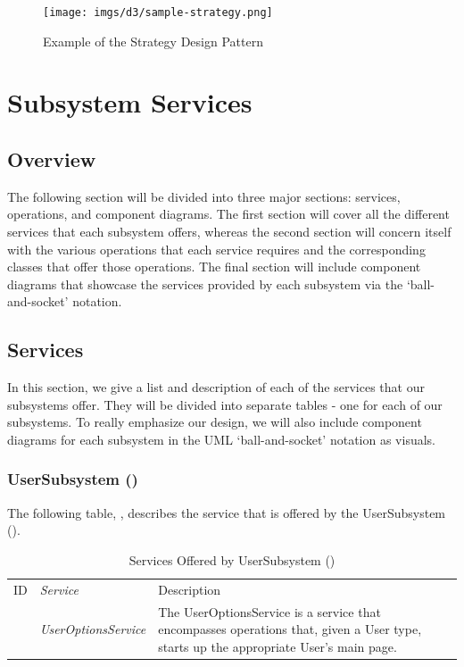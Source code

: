 \documentclass[12pt,letterpaper]{article}
\begin{document}
\begin{figure}[H]
	\centering{}
	\texttt{[image: imgs/d3/sample-strategy.png]}
	\caption{Example of the Strategy Design Pattern}
\end{figure}

\section{Subsystem Services}
\subsection{Overview}

The following section will be divided into three major sections: services, operations, and component diagrams. The first section will cover all the different services that each subsystem offers, whereas the second section will concern itself with the various operations that each service requires and the corresponding classes that offer those operations. The final section will include component diagrams that showcase the services provided by each subsystem via the `ball-and-socket' notation.

\subsection{Services}

In this section, we give a list and description of each of the services that our subsystems offer. They will be divided into separate tables - one for each of our subsystems. To really emphasize our design, we will also include component diagrams for each subsystem in the UML `ball-and-socket' notation as visuals.

\subsubsection{UserSubsystem ()}

The following table, , describes the service that is offered by the UserSubsystem ().

\begin{table}[H]
	\caption{Services Offered by UserSubsystem ()} 
	\begin{tabu} to 
		\tableheader{}ID & Service & Description\\
		 & UserOptionsService & The UserOptionsService is a service that encompasses operations that, given a User type, starts up the appropriate User's main page.\\
	\end{tabu}
\end{table}
\end{document}
